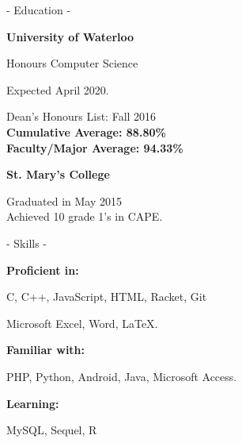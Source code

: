 \documentclass{article}
\begin{document}

\hfill
{} \par


\begin{minipage}[t]{0.35\textwidth}

{\LARGE\sc - Education -} \smallskip\par
{\large\sffamily\bf University of Waterloo}\\
{\selectfont 
Honours Computer Science\par
\footnotesize Expected April 2020.\par
\small{}\selectfont
Dean's Honours List: Fall 2016\\\bf
Cumulative Average: 88.80\%\\
Faculty/Major Average: 94.33\%}
\smallskip

{\large\sffamily\bf St. Mary's College} \par
{\small{}\selectfont\small Graduated in May 2015\\Achieved 10 grade 1's in CAPE.}
\bigskip


{\LARGE\sc - Skills -} \smallskip\par
{\large\sffamily\bf Proficient in: \par}
{\small{}\selectfont C, C++, JavaScript, HTML, Racket, Git\par Microsoft Excel, Word, \LaTeX.}\par
{\large\sffamily\bf Familiar with: \par}
{\small{}\selectfont PHP, Python, Android, Java, Microsoft Access.}\par
{\large\sffamily\bf Learning: \par}
{\small{}\selectfont MySQL, Sequel, R}\par
\bigskip



\end{minipage}
\end{document}

